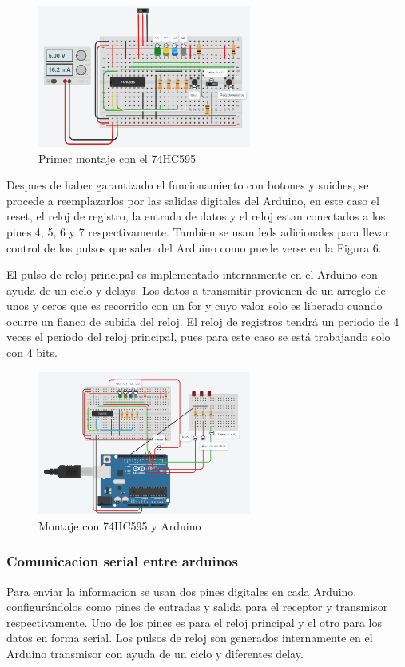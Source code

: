 \documentclass{article}
\begin{document}
\begin{figure}[ht]
\includegraphics[width=7cm]{montaje0.PNG}
\centering
\caption{Primer montaje con el 74HC595}
\end{figure}

Despues de haber garantizado el funcionamiento con botones y suiches, se procede a reemplazarlos por las salidas digitales del Arduino, en este caso el reset, el reloj de registro, la entrada de datos y el reloj estan conectados a los pines 4, 5, 6 y 7 respectivamente. Tambien se usan leds adicionales para llevar control de los pulsos que salen del Arduino como puede verse en la Figura 6.

El pulso de reloj principal es implementado internamente en el Arduino con ayuda de un ciclo y delays. Los datos a transmitir provienen de un arreglo de unos y ceros que es recorrido con un for y cuyo valor solo es liberado  cuando ocurre un flanco de subida del reloj. El reloj de registros tendrá un periodo de 4 veces el periodo del reloj principal, pues para este caso se está trabajando solo con 4 bits.


\begin{figure}[!ht] 
\includegraphics[width=7cm]{montaje1.PNG}
\centering
\caption{Montaje con 74HC595 y Arduino}
\end{figure}

\subsubsection{Comunicacion serial entre arduinos}
Para enviar la informacion se usan dos pines digitales en cada Arduino, configurándolos como pines de entradas y salida para el receptor y transmisor respectivamente. Uno de los pines es para el reloj principal y el otro para los datos en forma serial. Los pulsos de reloj son generados internamente en el Arduino transmisor con ayuda de un ciclo y diferentes delay.\\
\end{document}
